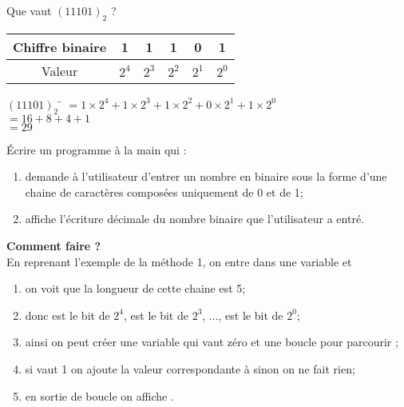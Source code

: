 \documentclass[a4paper,12pt,french]{book}
\begin{document}

\begin{methode}
Que vaut $(11101)_2$ ?
\begin{center}
	\begin{tabular}{|c|c|c|c|c|c|}
		\hline 
		Chiffre binaire & 1 & 1 & 1 & 0 & 1 \\ 
		\hline 
		Valeur & $2^4$ & $2^3$ & $2^2$ & $2^1$ & $2^0$ \\ 
		\hline 
	\end{tabular}
\end{center}
\begin{tabbing}
		$(11101)_2$	\= 	$=1\times 2^4+1\times 2^3+1\times 2^2+0\times 2^1+1\times 2^0$	\\
			\>	$=16+8+4+1$	\\	
			\>	$=29$	
	\end{tabbing}\nopagebreak
\end{methode}
\begin{exercice}[]
	\'Ecrire un programme à la main qui :
\begin{enumerate}[--]
	\item 	demande à l'utilisateur d'entrer un nombre en binaire sous la forme d'une chaine de caractères composées uniquement de 0 et de 1;
	\item 	affiche l'écriture décimale du nombre binaire que l'utilisateur a entré.\\
\end{enumerate}

\textbf{Comment faire ?}\\

En reprenant l'exemple de la méthode 1, on entre  dans une variable  et
\begin{enumerate}[--]
	\item 	on voit que la longueur de cette chaine est 5;
	\item 	donc  est le bit de $2^4$,  est le bit de $2^3$, ...,  est le bit de $2^0$;
	\item 	ainsi on peut créer une variable  qui vaut zéro et une boucle  pour parcourir ;
	\item 	si  vaut 1 on ajoute la valeur correspondante à  sinon on ne fait rien;
	\item 	en sortie de boucle on affiche .
\end{enumerate}
\end{exercice}
\end{document}
